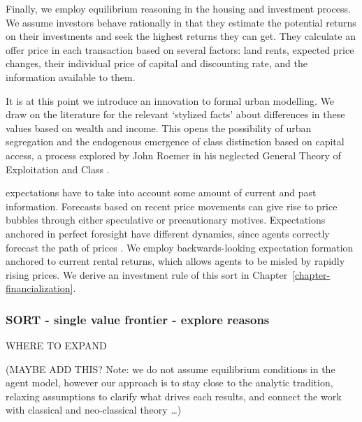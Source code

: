 Finally, we employ \gls{equilibrium reasoning} in the housing and investment process. We assume investors behave rationally in that they estimate the potential returns on their investments and seek the highest returns they can get. They calculate an offer price in each transaction based on several factors: land rents, expected price changes, their individual price of capital and discounting rate, and the information available to them.

It is at this point we introduce an innovation to formal urban modelling. We draw on the literature for the relevant `\gls{stylized facts}' about differences in these values based on wealth and income. This opens the possibility of urban segregation and the endogenous emergence of \gls{class} distinction based on capital access, a process explored by John Roemer in his neglected General Theory of Exploitation and Class \cite{roemerGeneralTheoryExploitation1982}.  

\Gls{expectations} have to take into account some amount of current and past information. Forecasts based on recent price movements can give rise to \gls{price bubble}s through either speculative or precautionary motives. Expectations anchored in \gls{perfect foresight} have different dynamics, since agents correctly forecast the path of prices \cite{muthRationalExpectationsTheory1961}. We employ backwards-looking expectation formation anchored 
to current rental returns, which allows agents to be misled by rapidly rising prices. We derive an investment rule of this sort in Chapter~\ref{chapter-financialization}. 

\subsubsection{SORT - single value frontier - explore reasons}
WHERE TO EXPAND%

(MAYBE ADD THIS? Note: we do not assume equilibrium conditions in the agent model, however our approach is to stay close to the analytic tradition, relaxing assumptions to clarify what drives each results, and connect the work with classical and neo-classical theory \dots)

